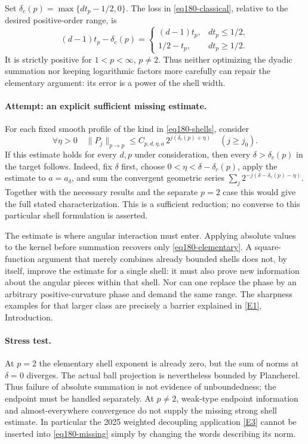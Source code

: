 \documentclass[11pt,a4paper]{article}
\newcommand{\eref}[2]{\hyperlink{extra:#1:#2}{[E#2]}}
\numberwithin{equation}{section}
\begin{document}
Set $\delta_c(p)=\max\{dt_p-1/2,0\}$. The loss in
\eqref{eq180-classical}, relative to the desired positive-order range, is
\begin{equation}\label{eq180-loss}
 (d-1)t_p-\delta_c(p)=
 \begin{cases}(d-1)t_p,&dt_p\le1/2,\\
               1/2-t_p,&dt_p\ge1/2.
 \end{cases}
\end{equation}
It is strictly positive for $1<p<\infty$, $p\ne2$. Thus neither optimizing
the dyadic summation nor keeping logarithmic factors more carefully can
repair the elementary argument: its error is a power of the shell width.

\paragraph{Attempt: an explicit sufficient missing estimate.}
For each fixed smooth profile of the kind in \eqref{eq180-shells}, consider
\begin{equation}\label{eq180-missing}
 \forall\eta>0\quad
 \|P_j\|_{p\to p}\le C_{p,d,\eta,a}\,
                         2^{j(\delta_c(p)+\eta)}
                  \quad(j\ge j_0).
\end{equation}
If this estimate holds for every $d,p$ under consideration, then every
$\delta>\delta_c(p)$ in the target follows. Indeed, fix $\delta$ first,
choose $0<\eta<\delta-\delta_c(p)$, apply the estimate to
$a=a_\delta$, and sum the convergent geometric series
$\sum_j2^{-j(\delta-\delta_c(p)-\eta)}$.
Together with the necessary results and the separate $p=2$ case this
would give the full stated characterization. This is a sufficient
reduction; no converse to this particular shell formulation is asserted.

The estimate is where angular interaction must enter. Applying absolute
values to the kernel before summation recovers only
\eqref{eq180-elementary}. A square-function argument that merely combines
already bounded shells does not, by itself, improve the estimate for a
single shell: it must also prove new information about the angular pieces
within that shell. Nor can one replace the phase by an arbitrary
positive-curvature phase and demand the same range. The sharpness examples
for that larger class are precisely a barrier explained in
\eref{180}{1}, Introduction.

\paragraph{Stress test.}
At $p=2$ the elementary shell exponent is already zero, but the sum of
norms at $\delta=0$ diverges. The actual ball projection is nevertheless
bounded by Plancherel. Thus failure of absolute summation is not evidence
of unboundedness; the endpoint must be handled separately. At $p\ne2$,
weak-type endpoint information and almost-everywhere convergence do not
supply the missing strong shell estimate. In particular the 2025 weighted
decoupling application \eref{180}{3} cannot be inserted into
\eqref{eq180-missing} simply by changing the words describing its norm.
\end{document}
